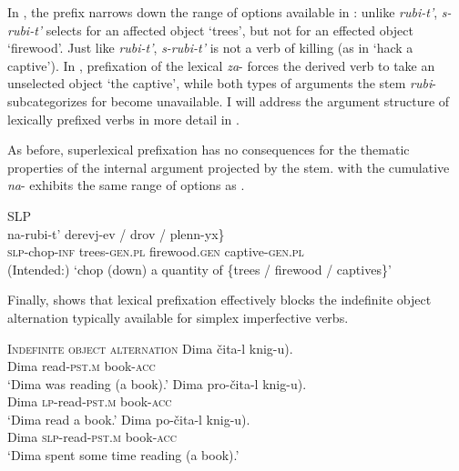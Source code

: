 \documentclass[output=paper,colorlinks,citecolor=brown]{langscibook}
\begin{document}
\noindent In , the prefix narrows down the range of options available in : unlike \textit{rubi-t’}, \textit{s-rubi-t’} selects for an affected object ‘trees’, but not for an effected object ‘firewood’. Just like \textit{rubi-t’}, \textit{s-rubi-t’} is not a verb of killing (as in ‘hack a captive’).  In , prefixation of the lexical \textit{za}- forces the derived verb to take an unselected object ‘the captive’, while both types of arguments the stem \textit{rubi}- subcategorizes for become unavailable. I will address the argument structure of lexically prefixed verbs in more detail in .

As before, superlexical prefixation has no consequences for the thematic properties of the internal argument projected by the stem.  with the cumulative \textit{na}- exhibits the same range of options as .

\ea   \textsc{SLP}\\\label{tat:ex:27}
\gll na-rubi-t’   \minsp{\{} derevj-ev   /    drov   /  \minsp{*} plenn-yx\}\\
  \textsc{slp}-chop-\textsc{inf} {} trees-\textsc{gen.pl}  {}  firewood.\textsc{gen}   {} {} captive-\textsc{gen.pl}\\
\glt (Intended:) ‘chop (down) a quantity of \{trees / firewood / captives\}’
\z

\noindent Finally,  shows that lexical prefixation effectively blocks the indefinite object alternation typically available for simplex imperfective verbs.

\ea    \textsc{Indefinite object alternation}\label{tat:ex:28}
\ea
\gll Dima   čita-l   \minsp{(} knig-u).\\
    Dima  read-\textsc{pst.m}  {} book-\textsc{acc}\\
\glt  ‘Dima was reading (a book).’\label{ex:tatevosov:28a}
\ex
\gll    Dima    pro-čita-l   \minsp{*(} knig-u).\\
    Dima  \textsc{lp}-read-\textsc{pst.m}  {} book-\textsc{acc}\\
\glt  ‘Dima read a book.’\label{ex:tatevosov:28b}
\ex
\gll    Dima    po-čita-l     \minsp{(} knig-u).\\
    Dima  \textsc{slp}-read-\textsc{pst.m}  {}  book-\textsc{acc}\\
\glt  ‘Dima spent some time reading (a book).’\label{ex:tatevosov:28c}
\z
\z
\end{document}
